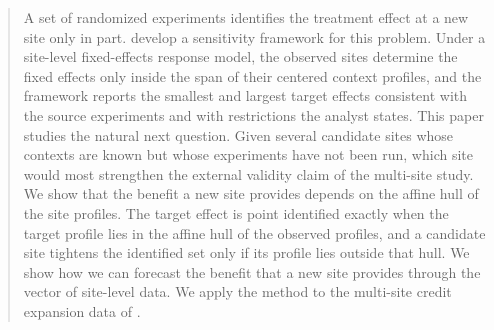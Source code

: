 \begin{abstract}
A set of randomized experiments identifies the treatment effect at a new
site only in part. \citet{boyarsky2026} develop a sensitivity framework
for this problem. Under a site-level fixed-effects response model, the
observed sites determine the fixed effects only inside the span of their
centered context profiles, and the framework reports the smallest and
largest target effects consistent with the source experiments and with
restrictions the analyst states. This paper studies the natural next question. Given several candidate sites whose contexts are known but whose
experiments have not been run, which site would most strengthen the
external validity claim of the multi-site study. We show that the benefit a new site provides depends on the affine hull
of the site profiles. The target effect is
point identified exactly when the target profile lies in the affine hull
of the observed profiles, and a candidate site tightens the identified
set only if its profile lies outside that hull. We show how we can forecast the benefit that a new site provides through the vector of site-level data. We apply the method to the multi-site credit expansion data of
\citet{meager2019understanding}.
\end{abstract}
